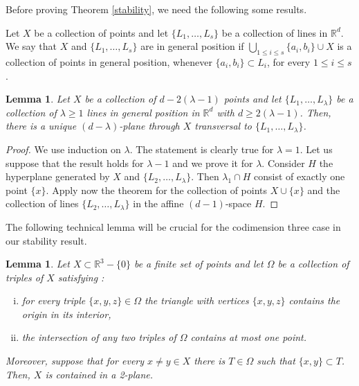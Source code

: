 \documentclass[11pt]{amsart}
\theoremstyle{plain}
\newtheorem{lemma}[theorem]{Lemma}
\theoremstyle{definition}
\theoremstyle{remark}
\begin{document}
Before proving Theorem \ref{stability}, we need the following some results.
\medskip

Let $X$ be a collection of points and let $\{L_1, \dots , L_s \}$ be a collection of lines  in $\mathbb{R}^{d}$. We say that $X$ and  $\{L_1, \dots , L_s \}$ are in general position if $\bigcup_{1{\leqslant} i{\leqslant} s}\{a_i, b_i\} \cup X$ is a collection of points in general position, whenever $\{a_i, b_i\} \subset L_i$, for every ${1{\leqslant} i{\leqslant} s}$.

\begin{lemma}\label{lem1}
Let $X$ be a collection of $d-2(\lambda-1)$ points and let $\{L_1, \dots , L_\lambda \}$ be a collection of $\lambda{\geqslant} 1$ lines in general position in $\mathbb{R}^{d}$ with $d{\geqslant} 2(\lambda-1)$.  Then, there is a unique $(d-\lambda)$-plane through $X$ transversal to $\{L_1, \dots , L_\lambda \}$.
\end{lemma}

\begin{proof}
We use induction on $\lambda$. The statement is clearly true for $\lambda=1$. Let us suppose that the result holds for $\lambda-1$ and we prove it for $\lambda$. Consider $H$ the hyperplane generated by $X$ and $\{L_2, \dots , L_\lambda \}$. Then $\lambda_1\cap H$ consist of exactly one point $\{x\}$. Apply now the theorem for the collection of points $X\cup\{x\}$ and the collection of lines $\{L_2, \dots , L_\lambda \}$ in the affine $(d-1)$-space $H$. 
\end{proof}

The following technical lemma will be crucial for the codimension three case in our stability result.

\begin{lemma}\label{lem2}
Let $X \subset \mathbb{R}^{3}-\{0\}$  be a finite set of points and let $\Omega$ be a collection of triples of $X$ satisfying : 
\begin{enumerate}[i)]
\item
for every triple $\{x,y,z \} \in \Omega$ the triangle with vertices $\{x,y,z \}$ contains the origin in its interior, 
\item
the intersection of any two triples of $\Omega$ contains at most one point.
\end{enumerate}
Moreover, suppose that for every $x \not= y \in X$ there is $T \in \Omega$ such that  $\{x,y \} \subset T$.  Then, $X$ is contained in a 2-plane.
\end{lemma}
\end{document}
